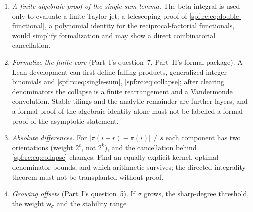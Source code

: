 \documentclass[11pt]{article}
\numberwithin{equation}{section}
\theoremstyle{definition}
\theoremstyle{remark}
\theoremstyle{definition}
\newcommand{\bigO}{\mathrm O}
\newcommand{\rcw}{\mathsf w}
\newcommand{\bcC}{C_{\!*}}
\begin{document}
\begin{enumerate}
the growth of $\widehat C$ in sectors and whether an accelerated or
nonstandard Laplace transform recovers a natural analytic object; a complete
answer names the function reconstructed, the directions, the optimal
truncation order in $n$, and the relation to the finite counts.
[Added 4 October 2026, batch 97: answered at $(2,2)$ by Part~V, except for
optimality. The function reconstructed is the positive-ray sum
$\bcC(n)=1+\int_0^\infty e^{-nt}\widehat C(t)\,dt$, convergent exactly for
$\Re n>1$ and meromorphic in $n$ (\cref{spf:bc:thm:sum,spf:bc:cor:meromorphic});
the admissible geometry is a horizontal strip of half-width $\pi/4$, and no
open angular sector about the positive axis carries an exponential bound
(\cref{spf:bc:thm:strip,spf:bc:cor:nonsectorial}); the truncation order
$M=\lfloor n(\frac12\log n-1)\rfloor$ gives the error
$\exp(-\frac12n\log n+\bigO(n))$ (\cref{spf:bc:thm:truncation}), with no proof
of optimality; and the finite counts differ from $\bcC$ by a flat term that is
nonzero in every block of four indices (\cref{spf:bc:thm:flat-nonzero}). The
optimal truncation and its prefactor remain open (Part~V, question~4).]
\item \emph{A finite-algebraic proof of the single-sum lemma.} The beta
integral is used only to evaluate a finite Taylor jet; a telescoping proof
of \eqref{spf:rc:eq:double-functional}, a polynomial identity for the
reciprocal-factorial functionals, would simplify formalization and may show
a direct combinatorial cancellation.
\item \emph{Formalize the finite core} (Part~I's question~7, Part~II's formal
package). A Lean development can first define falling products, generalized
integer binomials and \eqref{spf:rc:eq:single-sum},
\eqref{spf:rc:eq:collapse}; after clearing denominators the collapse is a
finite rearrangement and a Vandermonde convolution. Stable tilings and the
analytic remainder are further layers, and a formal proof of the algebraic
identity alone must not be labelled a formal proof of the asymptotic
statement.
\item \emph{Absolute differences.} For $|\pi(i+r)-\pi(i)|\ne s$ each
component has two orientations (weight $2^c$, not $2^k$), and the
cancellation behind \eqref{spf:rc:eq:collapse} changes. Find an equally
explicit kernel, optimal denominator bounds, and which arithmetic survives;
the directed integrality theorem must not be transplanted without proof.
\item \emph{Growing offsets} (Part~I's question~5). If $\sigma$ grows, the
sharp-degree threshold, the weight $\rcw_\sigma$ and the stability range

\end{enumerate}
\end{document}
